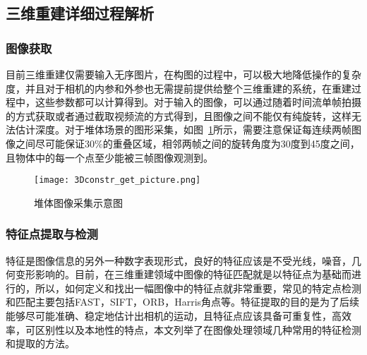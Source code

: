 \subsection{三维重建详细过程解析}
\label{sec:3.2.2}
\subsubsection{图像获取} 
\label{sec:3.2.2.1}
目前三维重建仅需要输入无序图片，在构图的过程中，可以极大地降低操作的复杂度，并且对于相机的内参和外参也无需提前提供给整个三维重建的系统，在重建过程中，这些参数都可以计算得到。对于输入的图像，可以通过随着时间流单帧拍摄的方式获取或者通过截取视频流的方式得到，且图像之间不能仅有纯旋转，这样无法估计深度。对于堆体场景的图形采集，如图~\ref{fig:3Dconstr_get_picture}所示，需要注意保证每连续两帧图像之间尽可能保证30$\%$的重叠区域，相邻两帧之间的旋转角度为30度到45度之间，且物体中的每一个点至少能被三帧图像观测到。
\begin{figure}[h] %
  \centering
  \texttt{[image: 3Dconstr\_get\_picture.png]}
  \caption{堆体图像采集示意图}
  \label{fig:3Dconstr_get_picture}
  \end{figure}
\subsubsection{特征点提取与检测} 
\label{sec:3.2.2.2}
特征是图像信息的另外一种数字表现形式，良好的特征应该是不受光线，噪音，几何变形影响的。目前，在三维重建领域中图像的特征匹配就是以特征点为基础而进行的，所以，如何定义和找出一幅图像中的特征点就非常重要，常见的特定点检测和匹配主要包括FAST，SIFT，ORB，Harris角点等。特征提取的目的是为了后续能够尽可能准确、稳定地估计出相机的运动，且特征点应该具备可重复性，高效率，可区别性以及本地性的特点，本文列举了在图像处理领域几种常用的特征检测和提取的方法。

